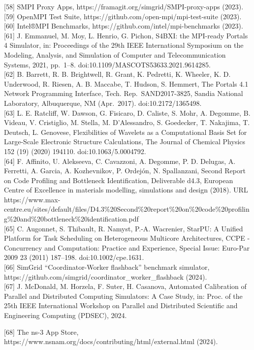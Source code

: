 \documentclass[
]{article}
\begin{document}
{[}58{]} SMPI Proxy Apps, https://framagit.org/simgrid/SMPI-proxy-apps
(2023).\\
{[}59{]} OpenMPI Test Suite, https://github.com/open-mpi/mpi-test-suite
(2023).\\
{[}60{]} Intel®MPI Benchmarks, https://github.com/intel/mpi-benchmarks
(2023).\\
{[}61{]} J. Emmanuel, M. Moy, L. Henrio, G. Pichon, S4BXI: the MPI-ready
Portals 4 Simulator, in: Proceedings of the 29th IEEE International
Symposium on the Modeling, Analysis, and Simulation of Computer and
Telecommunication Systems, 2021, pp.~1--8.
doi:10.1109/MASCOTS53633.2021.9614285.\\
{[}62{]} B. Barrett, R. B. Brightwell, R. Grant, K. Pedretti, K.
Wheeler, K. D. Underwood, R. Riesen, A. B. Maccabe, T. Hudson, S.
Hemmert, The Portals 4.1 Network Programming Interface, Tech.
Rep.~SAND2017-3825, Sandia National Laboratory, Albuquerque, NM
(Apr.~2017). doi:10.2172/1365498.\\
{[}63{]} L. E. Ratcliff, W. Dawson, G. Fisicaro, D. Caliste, S. Mohr, A.
Degomme, B. Videau, V. Cristiglio, M. Stella, M. D'Alessandro, S.
Goedecker, T. Nakajima, T. Deutsch, L. Genovese, Flexibilities of
Wavelets as a Computational Basis Set for Large-Scale Electronic
Structure Calculations, The Journal of Chemical Physics 152 (19) (2020)
194110. doi:10.1063/5.0004792.\\
{[}64{]} F. Affinito, U. Alekseeva, C. Cavazzoni, A. Degomme, P. D.
Delugas, A. Ferretti, A. Garcia, A. Kozhevnikov, P. Ordejón, N.
Spallanzani, Second Report on Code Profiling and Bottleneck
Identification, Deliverable d4.3, European Centre of Excellence in
materials modelling, simulations and design (2018). URL
https://www.max-centre.eu/sites/default/files/D4.3\%20Second\%20report\%20on\%20code\%20profiling\%20and\%20bottleneck\%20identification.pdf\\
{[}65{]} C. Augonnet, S. Thibault, R. Namyst, P.-A. Wacrenier, StarPU: A
Unified Platform for Task Scheduling on Heterogeneous Multicore
Architectures, CCPE - Concurrency and Computation: Practice and
Experience, Special Issue: Euro-Par 2009 23 (2011) 187--198.
doi:10.1002/cpe.1631.\\
{[}66{]} SimGrid ``Coordinator-Worker flashback'' benchmark simulator,
https://github.com/simgrid/coordinator\_worker\_flashback (2024).\\
{[}67{]} J. McDonald, M. Horzela, F. Suter, H. Casanova, Automated
Calibration of Parallel and Distributed Computing Simulators: A Case
Study, in: Proc. of the 25th IEEE International Workshop on Parallel and
Distributed Scientific and Engineering Computing (PDSEC), 2024.

{[}68{]} The ns-3 App Store,
https://www.nsnam.org/docs/contributing/html/external.html (2024).
\end{document}
